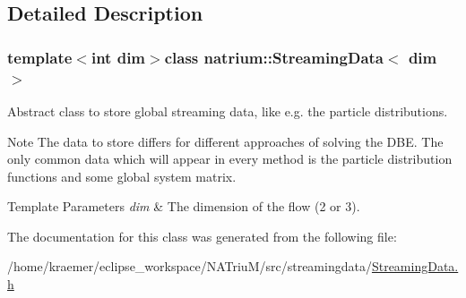 \subsection{\-Detailed \-Description}
\subsubsection*{template$<$int dim$>$class natrium\-::\-Streaming\-Data$<$ dim $>$}

\-Abstract class to store global streaming data, like e.\-g. the particle distributions. 

\begin{DoxyNote}{\-Note}
\-The data to store differs for different approaches of solving the \-D\-B\-E. \-The only common data which will appear in every method is the particle distribution functions and some global system matrix. 
\end{DoxyNote}

\begin{DoxyTemplParams}{\-Template Parameters}
{\em dim} & \-The dimension of the flow (2 or 3). \\
\hline
\end{DoxyTemplParams}


\-The documentation for this class was generated from the following file\-:\begin{DoxyCompactItemize}
\item 
/home/kraemer/eclipse\-\_\-workspace/\-N\-A\-Triu\-M/src/streamingdata/\hyperlink{StreamingData_8h}{\-Streaming\-Data.\-h}\end{DoxyCompactItemize}
